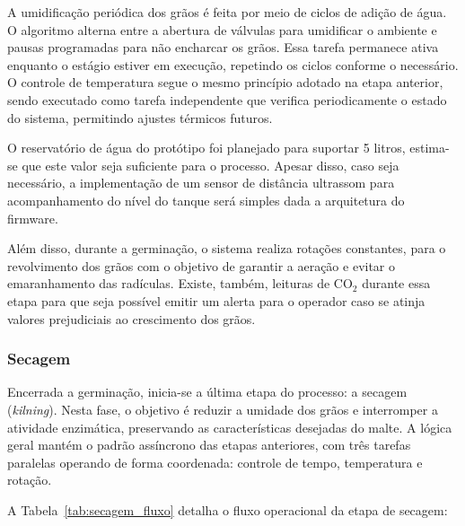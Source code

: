 A umidificação periódica dos grãos é feita por meio de ciclos de adição de água. O algoritmo alterna entre a abertura de válvulas para umidificar o ambiente e pausas programadas para não encharcar os grãos. Essa tarefa permanece ativa enquanto o estágio estiver em execução, repetindo os ciclos conforme o necessário. O controle de temperatura segue o mesmo princípio adotado na etapa anterior, sendo executado como tarefa independente que verifica periodicamente o estado do sistema, permitindo ajustes térmicos futuros.

O reservatório de água do protótipo foi planejado para suportar 5 litros, estima-se que este valor seja suficiente para o processo. Apesar disso, caso seja necessário, a implementação de um sensor de distância ultrassom para acompanhamento do nível do tanque será simples dada a arquitetura do firmware. 

Além disso, durante a germinação, o sistema realiza rotações constantes, para o revolvimento dos grãos com o objetivo de garantir a aeração e evitar o emaranhamento das radículas. Existe, também, leituras de CO$_{2}$ durante essa etapa para que seja possível emitir um alerta para o operador caso se atinja valores prejudiciais ao crescimento dos grãos.

\subsubsection{Secagem}

Encerrada a germinação, inicia-se a última etapa do processo: a secagem (\textit{kilning}). Nesta fase, o objetivo é reduzir a umidade dos grãos e interromper a atividade enzimática, preservando as características desejadas do malte. A lógica geral mantém o padrão assíncrono das etapas anteriores, com três tarefas paralelas operando de forma coordenada: controle de tempo, temperatura e rotação.

A Tabela~\ref{tab:secagem_fluxo} detalha o fluxo operacional da etapa de secagem:

